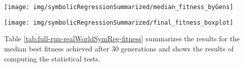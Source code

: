 \documentclass[
  11pt,
]{article}
\let\origfigure\figure
\let\endorigfigure\endfigure
\renewenvironment{figure}[1][2] {
    \expandafter\origfigure\expandafter[H]
} {
    \endorigfigure
}
\begin{document}
\begin{figure}[c]

{\centering \texttt{[image: img/symbolicRegressionSummarized/median\_fitness\_byGens]} 

}

\caption{Fitness over 30 Generations - Real World Symbolic Regression}\label{fig:symReg-Fitness}
\end{figure}

\begin{figure}[c]

{\centering \texttt{[image: img/symbolicRegressionSummarized/final\_fitness\_boxplot]} 

}

\caption{Fitness after 30 Generations - Real World Symbolic Regression}\label{fig:symReg-Fitness-BoxPlots}
\end{figure}

Table \ref{tab:full-run-realWorldSymReg-fitness} summarizes the results for the median best fitness achieved after 30 generations and shows the results of computing the statistical tests.
\end{document}
